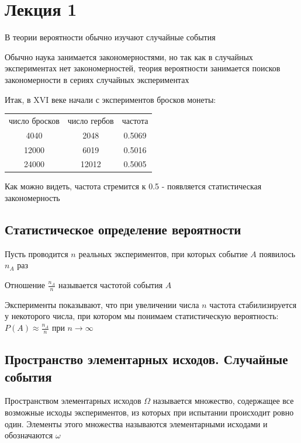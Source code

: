 \documentclass[12pt]{article}
\begin{document}
    \tableofcontents
    \clearpage


    \section{Лекция 1}

    В теории вероятности обычно изучают случайные события

    Обычно наука занимается закономерностями, но так как в случайных экспериментах нет закономерностей, теория
    вероятности занимается поисков закономерности в сериях случайных экспериментах

    Итак, в XVI веке начали с экспериментов бросков монеты:

    \begin{tabular}{ccc}
        число бросков & число гербов & частота \\
        4040 & 2048 & 0.5069 \\
        12000 & 6019 & 0.5016 \\
        24000 & 12012 & 0.5005 \\
    \end{tabular}

    Как можно видеть, частота стремится к 0.5 - появляется статистическая закономерность

    \subsection{Статистическое определение вероятности}

    Пусть проводится $n$ реальных экспериментов, при которых событие $A$ появилось $n_A$ раз

    Отношение $\frac{n_A}{n}$ называется частотой события $A$

    Эксперименты показывают, что при увеличении числа $n$ частота стабилизируется у некоторого числа,
    при котором мы понимаем статистическую вероятность: $P(A) \approx \frac{n_A}{n}$ при $n \to \infty$

    \subsection{Пространство элементарных исходов. Случайные события}

    \Def Пространством элементарных исходов $\Omega$ называется множество, содержащее все возможные исходы
    экспериментов, из которых при испытании происходит ровно один. Элементы этого множества называются
    элементарными исходами и обозначаются $\omega$
\end{document}
